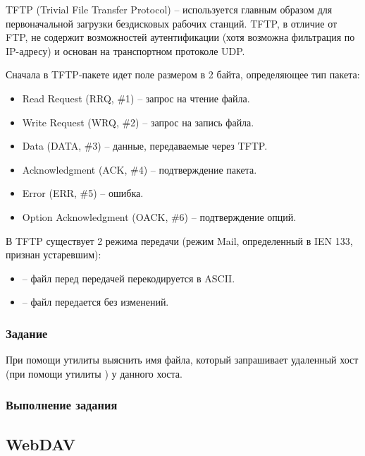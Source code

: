 TFTP (Trivial File Transfer Protocol) -- используется главным образом для первоначальной загрузки бездисковых рабочих станций. TFTP, в отличие от FTP, не содержит возможностей аутентификации (хотя возможна фильтрация по IP-адресу) и основан на транспортном протоколе UDP.

Сначала в TFTP-пакете идет поле размером в 2 байта, определяющее тип пакета:

\begin{itemize}
	\item Read Request (RRQ, \#1) -- запрос на чтение файла.
	\item Write Request (WRQ, \#2) -- запрос на запись файла.
	\item Data (DATA, \#3) -- данные, передаваемые через TFTP.
	\item Acknowledgment (ACK, \#4) -- подтверждение пакета.
	\item Error (ERR, \#5) -- ошибка.
	\item Option Acknowledgment (OACK, \#6) -- подтверждение опций.
\end{itemize}

В TFTP существует 2 режима передачи (режим Mail, определенный в IEN 133, признан устаревшим):

\begin{itemize}
	\item {} -- файл перед передачей перекодируется в ASCII.
	\item {} -- файл передается без изменений.
\end{itemize}

\subsubsection{Задание}

При помощи утилиты  выяснить имя файла, который запрашивает удаленный хост (при помощи утилиты ) у данного хоста.

\subsubsection{Выполнение задания}



\subsection{WebDAV}

